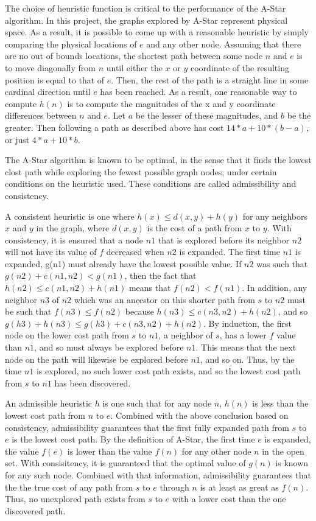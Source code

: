 The choice of heuristic function is critical to the performance of the A-Star algorithm. In this project, the graphs explored by A-Star represent physical space. As a result, it is possible to come up with a reasonable heuristic by simply comparing the physical locations of $e$ and any other node. Assuming that there are no out of bounds locations, the shortest path between some node $n$ and $e$ is to move diagonally from $n$ until either the $x$ or $y$ coordinate of the resulting position is equal to that of $e$. Then, the rest of the path is a straight line in some cardinal direction until $e$ has been reached. As a result, one reasonable way to compute $h(n)$ is to compute the magnitudes of the x and y coordinate differences between $n$ and $e$. Let $a$ be the lesser of these magnitudes, and $b$ be the greater. Then following a path as described above has cost $14 * a + 10 * (b - a)$, or just $4 * a  + 10 * b$. 

The A-Star algorithm is known to be optimal, in the sense that it finds the lowest clost path while exploring the fewest possible graph nodes, under certain conditions on the heuristic used. These conditions are called admissibility and consistency.

A consistent heuristic is one where $h(x) \leq d(x,y) + h(y)$ for any neighbors $x$ and $y$ in the graph, where $d(x, y)$ is the cost of a path from $x$ to $y$. With consistency, it is ensured that a node $n1$ that is explored before its neighbor $n2$ will not have its value of $f$ decreased when $n2$ is expanded. The first time $n1$ is expanded, g(n1) must already have the lowest possible value. If $n2$ was such that $g(n2) + c(n1, n2) < g(n1)$, then the fact that $h(n2) \leq c(n1, n2) + h(n1)$ means that $f(n2) < f(n1)$. In addition, any neighbor $n3$ of $n2$ which was an ancestor on this shorter path from $s$ to $n2$ must be such that $f(n3) \leq f(n2)$ because $h(n3) \leq c(n3, n2) + h(n2)$, and so $g (h3) + h(n3) \leq g (h3) + c(n3, n2) + h(n2)$. By induction, the first node on the lower cost path from $s$ to $n1$, a neighbor of $s$, has a lower $f$ value than $n1$, and so must always be explored before $n1$. This means that the next node on the path will likewise be explored before $n1$, and so on. Thus, by the time $n1$ is explored, no such lower cost path exists, and so the lowest cost path from $s$ to $n1$ has been discovered. 

An admissible heuristic $h$ is one such that for any node $n$, $h(n)$ is less than the lowest cost path from $n$ to $e$. Combined with the above conclusion based on consistency, admissibility guarantees that the first fully expanded path from $s$ to $e$ is the lowest cost path. By the definition of A-Star, the first time $e$ is expanded, the value $f(e)$ is lower than the value $f(n)$ for any other node $n$ in the open set. With consisitency, it is guaranteed that the optimal value of $g(n)$ is known for any such node. Combined with that information, admissibility guarantees that the the true cost of any path from $s$ to $e$ through $n$ is at least as great as $f(n)$. Thus, no unexplored path exists from $s$ to $e$ with a lower cost than the one discovered path.


